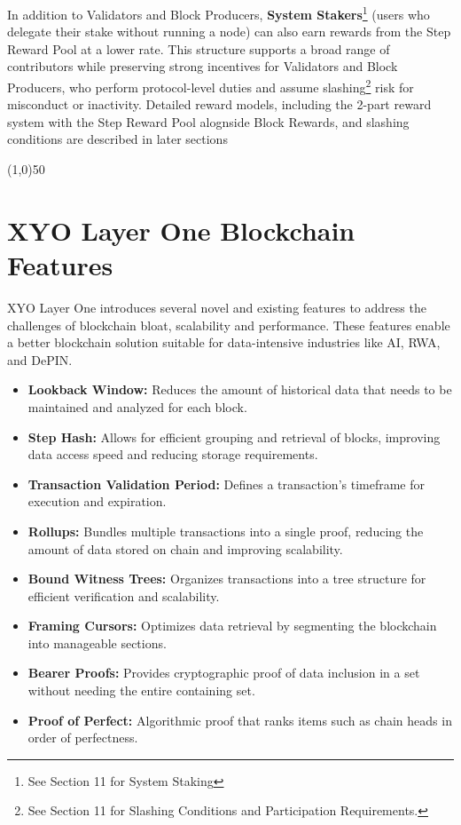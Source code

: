 \documentclass{article}
\begin{document}
In addition to Validators and Block Producers, \textbf{System
    Stakers}\footnote{See Section 11 for System Staking} (users who delegate their
stake without running a node) can also earn rewards from the Step Reward Pool
at a lower rate. This structure supports a broad range of contributors while
preserving strong incentives for Validators and Block Producers, who perform
protocol-level duties and assume slashing\footnote{See Section 11 for Slashing
    Conditions and Participation Requirements.} risk for misconduct or inactivity.
Detailed reward models, including the 2-part reward system with the Step Reward
Pool alognside Block Rewards, and slashing conditions are described in later
sections

\begin{center}
    \line(1,0){50}
\end{center}

\section{XYO Layer One Blockchain Features}
XYO Layer One introduces several novel and existing features to address the
challenges of blockchain bloat, scalability and performance. These features
enable a better blockchain solution suitable for data-intensive industries like
AI, RWA, and DePIN.

\begin{itemize}
    \item \textbf{Lookback Window:} Reduces the amount of historical data that needs to be maintained and analyzed for each block.
    \item \textbf{Step Hash:} Allows for efficient grouping and retrieval of blocks, improving data access speed and reducing storage requirements.
    \item \textbf{Transaction Validation Period:} Defines a transaction's timeframe for execution and expiration.
    \item \textbf{Rollups:} Bundles multiple transactions into a single proof, reducing the amount of data stored on chain and improving scalability.
    \item \textbf{Bound Witness Trees:} Organizes transactions into a tree structure for efficient verification and scalability.
    \item \textbf{Framing Cursors:} Optimizes data retrieval by segmenting the blockchain into manageable sections.
    \item \textbf{Bearer Proofs:} Provides cryptographic proof of data inclusion in a set without needing the entire containing set.
    \item \textbf{Proof of Perfect:} Algorithmic proof that ranks items such as chain heads in order of perfectness.
\end{itemize}
\end{document}
